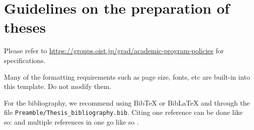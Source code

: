 
\chapter{Guidelines on the preparation of theses} \label{ch-1}

Please refer to \url{https://groups.oist.jp/grad/academic-program-policies} for specifications.

Many of the formatting requirements such as page size, fonts, etc are built-in into this template. Do not modify them.

For the bibliography, we recommend using BibTeX or BibLaTeX and through the file \texttt{Preamble/Thesis\_bibliography.bib}. Citing one reference can be done like so: \cite{Lee98} and multiple references in one go like so \cite{Fil09, Muc10, Kra27}.
